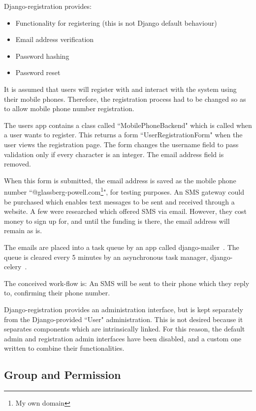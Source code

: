 Django-registration provides:
\begin{itemize}
\item Functionality for registering (this is not Django default behaviour)
\item Email address verification
\item Password hashing
\item Password reset
\end{itemize}

It is assumed that users will register with and interact with the system using their mobile phones. Therefore, the registration process had to be changed so as to allow mobile phone number registration.

The users app contains a class called ``MobilePhoneBackend" which is called when a user wants to register. This returns a form ``UserRegistrationForm" when the user views the registration page. The form changes the username field to pass validation only if every character is an integer. The email address field is removed.

When this form is submitted, the email address is saved as the mobile phone number ``@glassberg-powell.com\footnote{My own domain}", for testing purposes. An SMS gateway could be purchased which enables text messages to be sent and received through a website. A few were researched which offered SMS via email. However, they cost money to sign up for, and until the funding is there, the email address will remain as is.

The emails are placed into a task queue by an app called django-mailer~\cite{mailer}. The queue is cleared every 5 minutes by an asynchronous task manager, django-celery~\cite{celery}.

The conceived work-flow is: An SMS will be sent to their phone which they reply to, confirming their phone number.

Django-registration provides an administration interface, but is kept separately from the Django-provided ``User" administration. This is not desired because it separates components which are intrinsically linked. For this reason, the default admin and registration admin interfaces have been disabled, and a custom one written to combine their functionalities.

\subsection{Group and Permission}
\label{sec:di:login:gp}

